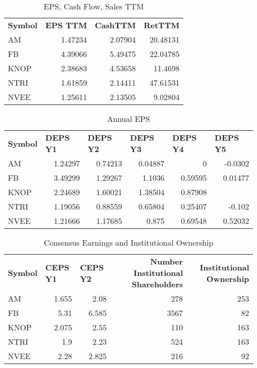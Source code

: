 \documentclass{article}
\begin{document}
\begin{table}[htbp]
  \caption{EPS, Cash Flow, Sales TTM}
   \begin{tabular}{lrrr}
    \textbf{Symbol} & \multicolumn{1}{l}{\textbf{EPS TTM}} & \multicolumn{1}{l}{\textbf{CashTTM}} & \multicolumn{1}{l}{\textbf{RetTTM}} \\
    AM    & 1.47234 & 2.07904 & 20.48131 \\
    FB    & 4.39066 & 5.49475 & 22.04785 \\
    KNOP  & 2.38683 & 4.53658 & 11.4698 \\
    NTRI  & 1.61859 & 2.14411 & 47.61531 \\
    NVEE  & 1.25611 & 2.13505 & 9.02804 \\
    \end{tabular}%
  \label{tab:addlabel}%
\end{table}%

\begin{table}[htbp]
  \caption{Annual EPS}
      \begin{tabular}{lrrrrr}
    \textbf{Symbol} & \multicolumn{1}{l}{\textbf{DEPS Y1}} & \multicolumn{1}{l}{\textbf{DEPS Y2}} & \multicolumn{1}{l}{\textbf{DEPS Y3}} & \multicolumn{1}{l}{\textbf{DEPS Y4}} & \multicolumn{1}{l}{\textbf{DEPS Y5}} \\
    AM    & 1.24297 & 0.74213 & 0.04887 & 0     & -0.0302 \\
    FB    & 3.49299 & 1.29267 & 1.1036 & 0.59595 & 0.01477 \\
    KNOP  & 2.24689 & 1.60021 & 1.38504 & 0.87908 &  \\
    NTRI  & 1.19056 & 0.88559 & 0.65804 & 0.25407 & -0.102 \\
    NVEE  & 1.21666 & 1.17685 & 0.875 & 0.69548 & 0.52032 \\
    \end{tabular}%
  \label{tab:addlabel}%
\end{table}%

\begin{table}[htbp]
  \caption{Consensus Earnings and Institutional Ownership}
    \begin{tabular}{lrrrr}
    \textbf{Symbol} & \multicolumn{1}{l}{\textbf{CEPS Y1}} & \multicolumn{1}{l}{\textbf{CEPS Y2}} & \multicolumn{1}{p{4.215em}}{\textbf{Number Institutional Shareholders}} & \multicolumn{1}{p{4.215em}}{\textbf{Institutional Ownership}} \\
    AM    & 1.655 & 2.08  & 278   & 253 \\
    FB    & 5.31  & 6.585 & 3567  & 82 \\
    KNOP  & 2.075 & 2.55  & 110   & 163 \\
    NTRI  & 1.9   & 2.23  & 524   & 163 \\
    NVEE  & 2.28  & 2.825 & 216   & 92 \\
    \end{tabular}%
  \label{tab:addlabel}%
\end{table}%
\end{document}
